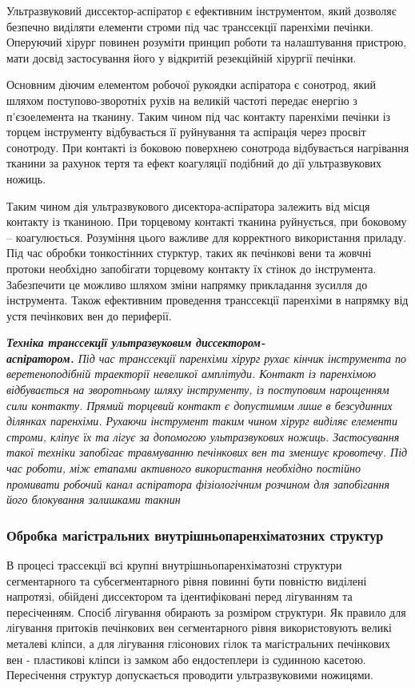 \begin{refsection}
Ультразвуковий диссектор-аспіратор є ефективним інструментом, який дозволяє безпечно виділяти елементи строми під час транссекції паренхіми печінки. Оперуючий хірург повинен розуміти принцип роботи та налаштування пристрою, мати досвід застосування його у відкритій резекційній хірургії печінки. 

Основним діючим елементом робочої рукоядки аспіратора є сонотрод, який шляхом поступово-зворотніх рухів на великій частоті передає енергію з п'єзоелемента на тканину. Таким чином під час контакту паренхіми печінки із торцем інструменту відбувається її руйнування та аспірація через просвіт сонотроду. При контакті із боковою поверхнею сонотрода відбувається нагрівання тканини за рахунок тертя та ефект коагуляції подібний до дії ультразвукових ножиць. 

Таким чином дія ультразвукового дисектора-аспіратора залежить від місця контакту із тканиною. При торцевому контакті тканина руйнується, при боковому -- коагулюється. Розуміння цього важливе для корректного використання приладу. Під час обробки тонкостінних стурктур, таких як печінкові вени та жовчні протоки необхідно запобігати торцевому контакту їх стінок до інструмента. Забезпечити це можливо шляхом зміни напрямку прикладання зусилля до інструмента. Також ефективним проведення транссекції паренхіми в напрямку від устя печінкових вен до периферії.

\textit{ \textbf{Техніка транссекції ультразвуковим диссектором-\\аспіратором.} Під час транссекції паренхіми хірург рухає кінчик інструмента по веретеноподібній траекторії невеликої амплітуди. Контакт із паренхімою відбувається на зворотньому шляху інструменту, із поступовим нарощенням сили контакту. Прямий торцевий контакт є допустимим лише в безсудинних ділянках паренхіми. Рухаючи інструмент таким чином хірург виділяє елементи строми, кліпує їх та лігує за допомогою ультразвукових ножиць. Застосування такої техніки запобігає травмуванню печінкових вен та зменшує кровотечу. Під час роботи, між етапами активного використання необхідно постійно промивати робочий канал аспіратора фізіологічним розчином для запобігання його блокування залишками такнин}

\subsubsection{Обробка магістральних внутрішньопаренхіматозних структур}

В процесі трассекції всі крупні внутрішньопаренхіматозні структури сегментарного та субсегментарного рівня повинні бути повністю виділені напротязі, обійдені диссектором та ідентифіковані перед лігуванням та пересіченням. Спосіб лігування обирають за розміром структури. Як правило для лігування притоків печінкових вен сегментарного рівня використовують великі металеві кліпси, а для лігування глісонових гілок та магістральних печінкових вен - пластикові кліпси із замком або ендостеплери із судинною касетою. Пересічення структур допускається проводити ультразвуковими ножицями. 


\end{refsection}
